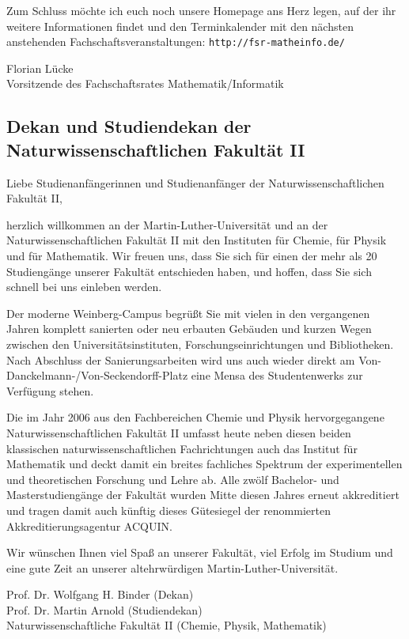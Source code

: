 Zum Schluss möchte ich euch noch unsere Homepage ans Herz legen, auf der ihr weitere Informationen findet und den Terminkalender mit den nächsten anstehenden Fachschaftsveranstaltungen: \texttt{http://fsr-matheinfo.de/}

Florian Lücke\\
Vorsitzende des Fachschaftsrates Mathematik/Informatik


\subsection{Dekan und Studiendekan der Naturwissenschaftlichen Fakultät II}

Liebe Studienanfängerinnen und Studienanfänger der Naturwissenschaftlichen
Fakultät II,

herzlich willkommen an der Martin-Luther-Universität und an der Naturwissenschaftlichen Fakultät II mit den Instituten für Chemie, für Physik und für Mathematik. Wir freuen uns, dass Sie sich für einen der mehr als 20 Studiengänge unserer Fakultät entschieden haben, und hoffen, dass Sie sich schnell bei uns einleben werden.

Der moderne Weinberg-Campus begrüßt Sie mit vielen in den vergangenen Jahren komplett sanierten oder neu erbauten Gebäuden und kurzen Wegen zwischen den Universitätsinstituten, Forschungseinrichtungen und Bibliotheken. Nach Abschluss der Sanierungsarbeiten wird uns auch wieder direkt am Von-Danckelmann-/Von-Seckendorff-Platz eine Mensa des Studentenwerks zur Verfügung stehen.

Die im Jahr 2006 aus den Fachbereichen Chemie und Physik hervorgegangene Naturwissenschaftlichen Fakultät II umfasst heute neben diesen beiden klassischen naturwissenschaftlichen Fachrichtungen auch das Institut für Mathematik und deckt damit ein breites fachliches Spektrum der experimentellen und theoretischen Forschung und Lehre ab. Alle zwölf Bachelor- und Masterstudiengänge der Fakultät wurden Mitte diesen Jahres erneut akkreditiert und tragen damit auch künftig dieses Gütesiegel der renommierten Akkreditierungsagentur ACQUIN.
 
Wir wünschen Ihnen viel Spaß an unserer Fakultät, viel Erfolg im Studium und eine gute Zeit an unserer altehrwürdigen Martin-Luther-Universität.
 
Prof. Dr. Wolfgang H. Binder (Dekan)\\
Prof. Dr. Martin Arnold (Studiendekan)\\
Naturwissenschaftliche Fakultät II (Chemie, Physik, Mathematik)


